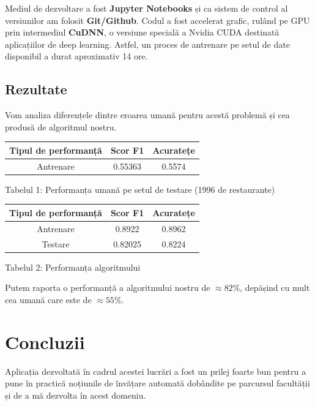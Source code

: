Mediul de dezvoltare a fost \textbf{Jupyter Notebooks} și ca sistem de control al versiunilor am folosit \textbf{Git/Github}. Codul a fost accelerat grafic, rulând pe GPU prin intermediul \textbf{CuDNN}, o versiune specială a Nvidia CUDA destinată aplicațiilor de deep learning. Astfel, un proces de antrenare pe setul de date disponibil a durat aproximativ 14 ore.

\subsection{Rezultate}
Vom analiza diferențele dintre eroarea umană pentru acestă problemă și cea produsă de algoritmul nostru.

\begin{center}
\begin{tabular}{|c|c|c|}
\hline Tipul de performanță & Scor F1 & Acuratețe \\
\hline Antrenare & 0.55363 & 0.5574 \\
\hline
\end{tabular}
\end{center}

\begin{center}
Tabelul 1: Performanța umană pe setul de testare (1996 de restaurante)
\end{center}

\begin{center}
\begin{tabular}{|c|c|c|}
\hline Tipul de performanță & Scor F1 & Acuratețe \\
\hline Antrenare & 0.8922 & 0.8962 \\
\hline Testare & 0.82025 & 0.8224  \\
\hline
\end{tabular}
\end{center}

\begin{center}
Tabelul 2: Performanța algoritmului
\end{center}

Putem raporta o performanță a algoritmului nostru de $\approx 82\%$, depășind cu mult cea umană care este de $\approx 55\%$.

\pagebreak

\section{Concluzii}
Aplicația dezvoltată în cadrul acestei lucrări a fost un prilej foarte bun pentru a pune în practică noțiunile de învățare automată dobândite pe parcursul facultății și de a mă dezvolta în acest domeniu. \\

